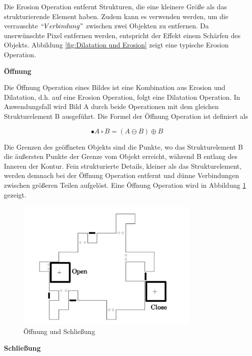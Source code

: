 Die Erosion Operation entfernt Strukturen, die eine kleinere Größe als das strukturierende Element haben. Zudem kann es verwenden werden, um die verrauschte $ ``Verbindung" $ zwischen zwei Objekten zu entfernen. Da unerwünschte Pixel entfernen werden, entspricht der Effekt einem Schärfen des Objekts. Abbildung \ref{fig:Dilatation und Erosion} zeigt eine typische Erosion Operation.


\textbf{Öffnung}

Die Öffnung Operation eines Bildes ist eine Kombination aus Erosion und Dilatation, d.h. auf eine Erosion Operation, folgt eine Dilatation Operation. In Anwendungsfall wird Bild A durch beide Operationen mit dem gleichen Strukturelement B ausgeführt. Die Formel der Öffnung Operation ist definiert als

\begin{equation}
•A \circ B =( A \ominus B )\oplus B  
\end{equation}

Die Grenzen des geöffneten Objekts sind die Punkte, wo das Strukturelement B die äußersten Punkte der Grenze vom Objekt erreicht, während B entlang des Inneren der Kontur. Fein strukturierte Details, kleiner als das Strukturelement, werden demnach bei der Öffnung Operation entfernt und dünne Verbindungen zwischen größeren Teilen aufgelöst. Eine Öffnung Operation wird in Abbildung \ref{fig:oeffnungundschliessung} gezeigt.

\begin{figure}[H]
 \centering 
  \includegraphics[keepaspectratio,width=0.8\textwidth]{images/4_ZweiteErfahrung/Morphological/oeffnungundschliessung.pdf}
 \caption{Öffnung und Schließung}
 \label{fig:oeffnungundschliessung}
\end{figure} 

\textbf{Schließung}

